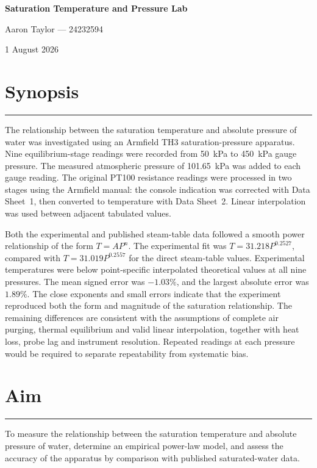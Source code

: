 \documentclass[11pt,a4paper]{article}
\newcommand{\sectionrule}{\vspace{-2pt}\color{rulegray}\hrule\color{black}\vspace{5pt}}
\begin{document}
\begin{center}
  {\LARGE\bfseries Saturation Temperature and Pressure Lab}\par
  \vspace{3mm}
  {\large Aaron Taylor --- 24232594}\par
  \vspace{1.5mm}
  {\large 1 August 2026}\par
\end{center}
\vspace{4mm}

\section*{Synopsis}
\sectionrule
The relationship between the saturation temperature and absolute pressure of
water was investigated using an Armfield TH3 saturation-pressure apparatus.
Nine equilibrium-stage readings were recorded from \SI{50}{\kilo\pascal} to
\SI{450}{\kilo\pascal} gauge pressure. The measured atmospheric pressure of
\SI{101.65}{\kilo\pascal} was added to each gauge reading. The original PT100
resistance readings were processed in two stages using the Armfield manual:
the console indication was corrected with Data Sheet~1, then converted to
temperature with Data Sheet~2. Linear interpolation was used between adjacent
tabulated values.

Both the experimental and published steam-table data followed a smooth power
relationship of the form $T=AP^n$. The experimental fit was
$T=31.218P^{0.2527}$, compared with $T=31.019P^{0.2557}$ for the direct
steam-table values. Experimental temperatures were below point-specific
interpolated theoretical values at all nine pressures. The mean signed error
was $-1.03\%$, and the largest absolute error was $1.89\%$. The close exponents
and small errors indicate that the experiment reproduced both the form and
magnitude of the saturation relationship. The remaining differences are
consistent with the assumptions of complete air purging, thermal equilibrium
and valid linear interpolation, together with heat loss, probe lag and
instrument resolution. Repeated readings at each pressure would be required
to separate repeatability from systematic bias.

\section{Aim}
\sectionrule
To measure the relationship between the saturation temperature and absolute
pressure of water, determine an empirical power-law model, and assess the
accuracy of the apparatus by comparison with published saturated-water data.
\end{document}
